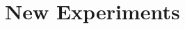 \appendix
\renewcommand{\thechapter}{B}
\renewcommand{\chaptername}{Appendix}

\chapter{New Experiments}

